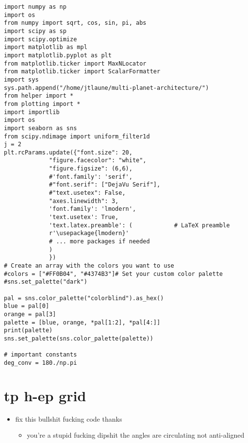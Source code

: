 \documentclass[11pt]{article}
\author{Jordan Laune}
\date{\today}
\title{}
\begin{document}
\tableofcontents

\begin{verbatim}
import numpy as np
import os
from numpy import sqrt, cos, sin, pi, abs
import scipy as sp
import scipy.optimize
import matplotlib as mpl
import matplotlib.pyplot as plt
from matplotlib.ticker import MaxNLocator
from matplotlib.ticker import ScalarFormatter
import sys
sys.path.append("/home/jtlaune/multi-planet-architecture/")
from helper import *
from plotting import *
import importlib
import os
import seaborn as sns
from scipy.ndimage import uniform_filter1d
j = 2
plt.rcParams.update({"font.size": 20,
		     "figure.facecolor": "white",
		     "figure.figsize": (6,6),
		     #'font.family': 'serif',
		     #"font.serif": ["DejaVu Serif"],
		     #"text.usetex": False,
		     "axes.linewidth": 3,
		     'font.family': 'lmodern',
		     'text.usetex': True,
		     'text.latex.preamble': (            # LaTeX preamble
			 r'\usepackage{lmodern}'
			 # ... more packages if needed
		     )
		     })
# Create an array with the colors you want to use
#colors = ["#FF0B04", "#4374B3"]# Set your custom color palette
#sns.set_palette("dark")

pal = sns.color_palette("colorblind").as_hex()
blue = pal[0]
orange = pal[3]
palette = [blue, orange, *pal[1:2], *pal[4:]]
print(palette)
sns.set_palette(sns.color_palette(palette))

# important constants
deg_conv = 180./np.pi
\end{verbatim}

\section{tp h-ep grid}
\label{sec:org8c4b396}
\begin{itemize}
\item fix this bullshit fucking code thanks
\begin{itemize}
\item you're a stupid fucking dipshit the angles are circulating not anti-aligned
\end{itemize}
\end{itemize}
\end{document}
